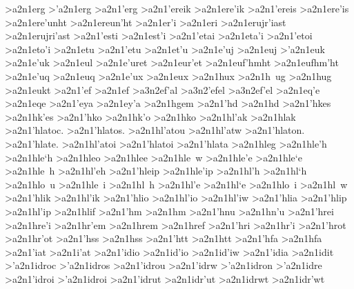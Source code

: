 {>a2n1erg    		%
>'a2n1erg   		%
>a2n1'erg
>a2n1'ereik 		%
>a2n1ere'ik
>a2n1'ereis 		%
>a2n1ere'is
>a2n1ere'unht 		%
>a2n1ereun'ht
>a2n1er'i   		%
>a2n1eri
>a2n1erujr'iast   	%
>a2n1erujri'ast
>a2n1'esti  		%
>a2n1est'i
>a2n1'etai  		%
>a2n1eta'i
>a2n1'etoi  		%
>a2n1eto'i
>a2n1etu    		%
>a2n1'etu  		%
>a2n1et'u
>a2n1e'uj   		%
>a2n1euj
>'a2n1euk   		%
>a2n1e'uk
>a2n1eul    		%
>a2n1e'uret 		%
>a2n1eur'et
>a2n1euf'hmht 		%
>a2n1eufhm'ht
 >a2n1e'uq   		%
 >a2n1euq
 >a2n1e'ux  		%
 >a2n1eux
 >a2n1hux  		%
 >a2n1h~ug		%
 >a2n1hug
 >a2n1eukt		%
>a2n1'ef    		%
>a2n1ef
	>a3n2ef'al  	%
	>a3n2'efel  	%
	>a3n2ef'el
>a2n1eq'e   		%
>a2n1eqe
>a2n1'eya   		%
>a2n1ey'a
>a2n1hgem   		%
>a2n1'hd    		%
>a2n1hd
>a2n1'hkes    		%
>a2n1hk'es
>a2n1'hko		%
>a2n1hk'o 
>a2n1hko
>a2n1hl'ak    		%
>a2n1hlak
>a2n1'hlatoc. 		%
>a2n1'hlatos.
>a2n1hl'atou
>a2n1hl'atw
>a2n1'hlaton.
>a2n1'hlate.
>a2n1hl'atoi
>a2n1'hlatoi
>a2n1'hlata
>a2n1hleg		%
>a2n1hle'h    		%
>a2n1hle`h
>a2n1hleo
>a2n1hlee
>a2n1hle~w
>a2n1hle'e
>a2n1hle`e
>a2n1hle~h
>a2n1hl'eh  	 	%
>a2n1'hleip		%
>a2n1hle'ip
>a2n1hl'h		%
>a2n1hl`h
>a2n1hlo~u
>a2n1hle~i
>a2n1hl~h
>a2n1hl'e
>a2n1hl`e
>a2n1hlo~i
>a2n1hl~w
>a2n1'hlik		%
>a2n1hl'ik
>a2n1'hlio 		%
>a2n1hl'io
>a2n1hl'iw
>a2n1'hlia
>a2n1'hlip		%
>a2n1hl'ip
>a2n1hlif    		%
>a2n1'hm    		%
>a2n1hm
>a2n1'hnu   		%
>a2n1hn'u
>a2n1'hrei  		%
>a2n1hre'i
>a2n1hr'em  		%
>a2n1hrem
>a2n1href   		%
>a2n1'hri   		%
>a2n1hr'i
>a2n1'hrot  		%
>a2n1hr'ot
>a2n1'hss   		%
>a2n1hss
>a2n1'htt   		%
>a2n1htt
>a2n1'hfa  		%
>a2n1hfa
>a2n1'iat   		%
>a2n1i'at
>a2n1'idio    		%
>a2n1id'io
>a2n1id'iw
>a2n1'idia
>a2n1idit    		%
>'a2n1idroc 		%
>'a2n1idros
>a2n1'idrou
>a2n1'idrw
>'a2n1idron
>'a2n1idre
>a2n1'idroi
>'a2n1idroi
>a2n1'idrut		%
>a2n1idr'ut
>a2n1idrwt		%
>a2n1idr'wt   	 	%
}
